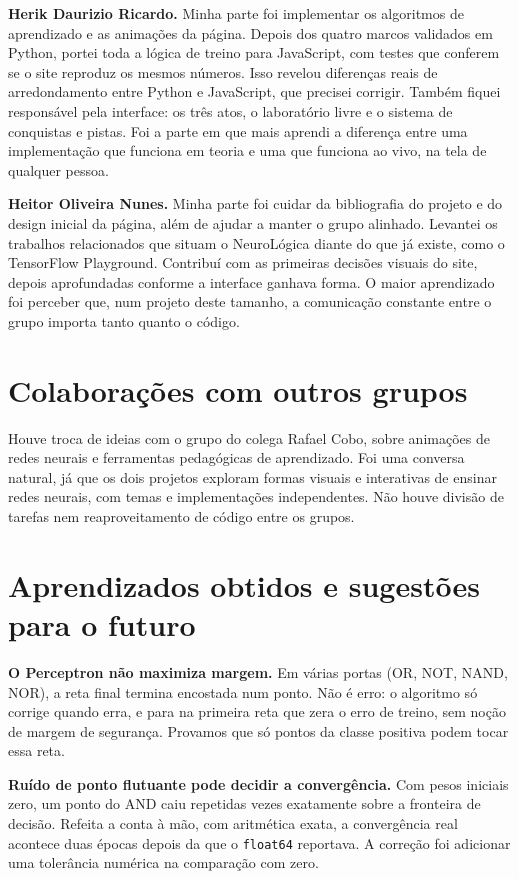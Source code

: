 \documentclass[11pt]{article}
\begin{document}
\smallskip
\textbf{Herik Daurizio Ricardo.} Minha parte foi implementar os algoritmos de aprendizado e
as animações da página. Depois dos quatro marcos validados em Python, portei toda a lógica
de treino para JavaScript, com testes que conferem se o site reproduz os mesmos números.
Isso revelou diferenças reais de arredondamento entre Python e JavaScript, que precisei
corrigir. Também fiquei responsável pela interface: os três atos, o laboratório livre e o
sistema de conquistas e pistas. Foi a parte em que mais aprendi a diferença entre uma
implementação que funciona em teoria e uma que funciona ao vivo, na tela de qualquer pessoa.

\smallskip
\textbf{Heitor Oliveira Nunes.} Minha parte foi cuidar da bibliografia do projeto e do
design inicial da página, além de ajudar a manter o grupo alinhado. Levantei os trabalhos
relacionados que situam o NeuroLógica diante do que já existe, como o TensorFlow Playground.
Contribuí com as primeiras decisões visuais do site, depois aprofundadas conforme a
interface ganhava forma. O maior aprendizado foi perceber que, num projeto deste tamanho, a
comunicação constante entre o grupo importa tanto quanto o código.

\section{Colaborações com outros grupos}

Houve troca de ideias com o grupo do colega Rafael Cobo, sobre animações de redes neurais e
ferramentas pedagógicas de aprendizado. Foi uma conversa natural, já que os dois projetos
exploram formas visuais e interativas de ensinar redes neurais, com temas e implementações
independentes. Não houve divisão de tarefas nem reaproveitamento de código entre os grupos.

\section{Aprendizados obtidos e sugestões para o futuro}

\textbf{O Perceptron não maximiza margem.} Em várias portas (OR, NOT, NAND, NOR), a reta
final termina encostada num ponto. Não é erro: o algoritmo só corrige quando erra, e para na
primeira reta que zera o erro de treino, sem noção de margem de segurança. Provamos que só
pontos da classe positiva podem tocar essa reta.

\smallskip
\textbf{Ruído de ponto flutuante pode decidir a convergência.} Com pesos iniciais zero, um
ponto do AND caiu repetidas vezes exatamente sobre a fronteira de decisão. Refeita a conta à
mão, com aritmética exata, a convergência real acontece duas épocas depois da que o
\texttt{float64} reportava. A correção foi adicionar uma tolerância numérica na comparação
com zero.
\end{document}
